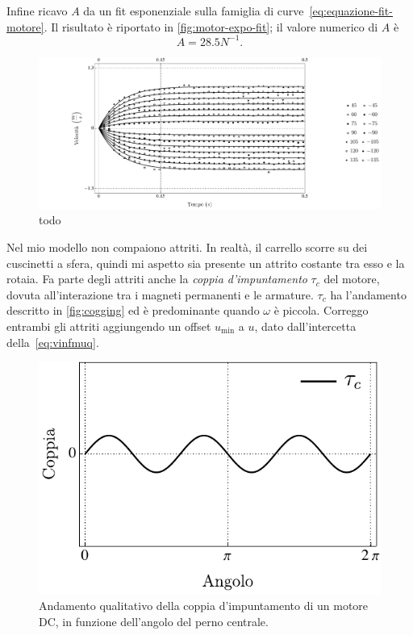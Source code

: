 Infine ricavo $A$ da un fit esponenziale sulla famiglia di curve~\eqref{eq:equazione-fit-motore}. Il risultato è riportato in \autoref{fig:motor-expo-fit}; il valore
numerico di $A$ è
\begin{equation*}
    A = 28.5 N^{-1}.
\end{equation*}

\begin{figure}[H]
    \centering
    \includegraphics[width=\textwidth]{docs/report/assets/motor-expo-fit}
    \caption[todo]{todo}
    \label{fig:motor-expo-fit}
\end{figure}

Nel mio modello non compaiono attriti.
In realtà, il carrello scorre su dei cuscinetti a sfera,
quindi mi aspetto sia presente un attrito costante tra esso e la rotaia.
Fa parte degli attriti anche la \emph{coppia d'impuntamento} $\tau_c$ del motore,
dovuta all'interazione tra i magneti permanenti e le armature. $\tau_c$ ha
l'andamento descritto in \autoref{fig:cogging} ed è predominante quando $\omega$ è
piccola.
Correggo entrambi gli attriti aggiungendo un offset $u_{\min} $ a $u$, dato dall'intercetta della~\eqref{eq:vinfmuq}.

 

\begin{figure}[H]
    \centering
    \includegraphics{assets/cogging-torque}
    \caption[Coppia d'impuntamento]{Andamento qualitativo della coppia d'impuntamento
    di un motore DC, in funzione dell'angolo del perno centrale.}
    \label{fig:cogging}
\end{figure}
